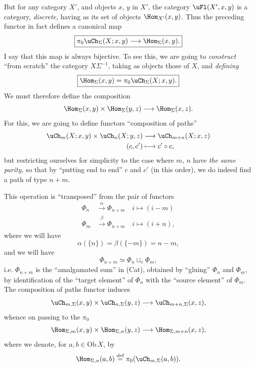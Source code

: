 But for any category $X'$, and objects $x$, $y$ in $X'$, the category $\uFl(X',x,y)$ is
a category, \textit{discrete,} having as its set of objects $\Hom_{X'}(x,y)$. Thus the preceding functor in fact defines a canonical map %
\[
\boxed{\pi_0\uCh_\Sigma(X;x,y)\longrightarrow\Hom_\Sigma(x,y).}
\]
I say that this map is always bijective. To see this, we are going to \textit{construct} ``from scratch'' the category $X\Sigma^{-1}$, taking as objects those of $X$, and \textit{defining} %
\[
\boxed{\Hom_\Sigma(x,y)=\pi_0\uCh_\Sigma(X;x,y).}
\]
We must therefore define the composition
\[
\Hom_\Sigma(x,y)\times\Hom_\Sigma(y,z)\longrightarrow\Hom_\Sigma(x,z).
\]
For this, we are going to define functors ``composition of paths''
\[
\begin{aligned}
\uCh_m(X;x,y)\times\uCh_n(X;y,z) &\longrightarrow \uCh_{m+n}(X;x,z)\\
(c,c') &\longmapsto c'\circ c,
\end{aligned}
\]
but restricting ourselves for simplicity to the case where $m$, $n$ have \textit{the same parity,} so that by ``putting end to end'' $c$ and $c'$ (in this order), we do indeed find a path of type $n+m$.

This operation is ``transposed'' from the pair of functors
\[
\begin{aligned}
\Phi_n &\xrightarrow{\alpha} \Phi_{n+m}\quad i\longmapsto (i-m)\\
\Phi_m &\xrightarrow{\beta} \Phi_{n+m}\quad i\longmapsto (i+n),
\end{aligned}
\]
where we will have
\[
\alpha(\{n\})=\beta(\{-m\})=n-m,
\]
and we will have
\[
\Phi_{n+m}\simeq\Phi_n\sqcup_e\Phi_m,
\]
i.e. $\Phi_{n+m}$ is the ``amalgamated sum'' in (Cat), obtained by ``gluing'' $\Phi_n$ and $\Phi_m$, by identification of the ``target element'' of $\Phi_n$ with the ``source element'' of $\Phi_m$. The composition of paths functor induces 
\[
\uCh_{m,\Sigma}(x,y)\times\uCh_{n,\Sigma}(y,z)\longrightarrow\uCh_{m+n,\Sigma}(x,z),
\]
whence on passing to the $\pi_0$
\[
\Hom_{\Sigma,m}(x,y)\times\Hom_{\Sigma,n}(y,z)\longrightarrow\Hom_{\Sigma,m+n}(x,z),
\]
where we denote, for $a,b\in\mathrm{Ob}\,X$, by
\[
\Hom_{\Sigma,n}(a,b)\overset{\text{def}}{=}\pi_0(\uCh_{m,\Sigma}(a,b)).
\]




